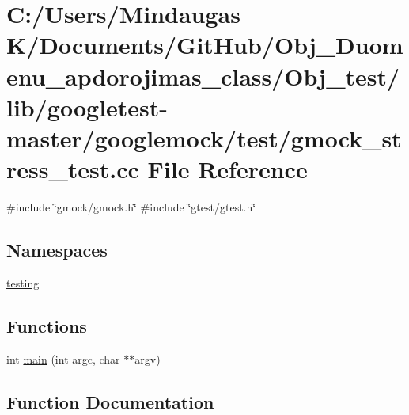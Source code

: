 \hypertarget{_obj__test_2lib_2googletest-master_2googlemock_2test_2gmock__stress__test_8cc}{}\section{C\+:/\+Users/\+Mindaugas K/\+Documents/\+Git\+Hub/\+Obj\+\_\+\+Duomenu\+\_\+apdorojimas\+\_\+class/\+Obj\+\_\+test/lib/googletest-\/master/googlemock/test/gmock\+\_\+stress\+\_\+test.cc File Reference}
\label{_obj__test_2lib_2googletest-master_2googlemock_2test_2gmock__stress__test_8cc}
{\ttfamily \#include \char`\"{}gmock/gmock.\+h\char`\"{}}\newline
{\ttfamily \#include \char`\"{}gtest/gtest.\+h\char`\"{}}\newline
\subsection*{Namespaces}
\begin{DoxyCompactItemize}
\item 
 \mbox{\hyperlink{namespacetesting}{testing}}
\end{DoxyCompactItemize}
\subsection*{Functions}
\begin{DoxyCompactItemize}
\item 
int \mbox{\hyperlink{_obj__test_2lib_2googletest-master_2googlemock_2test_2gmock__stress__test_8cc_a3c04138a5bfe5d72780bb7e82a18e627}{main}} (int argc, char $\ast$$\ast$argv)
\end{DoxyCompactItemize}


\subsection{Function Documentation}
\mbox{\label{_obj__test_2lib_2googletest-master_2googlemock_2test_2gmock__stress__test_8cc_a3c04138a5bfe5d72780bb7e82a18e627}} 
